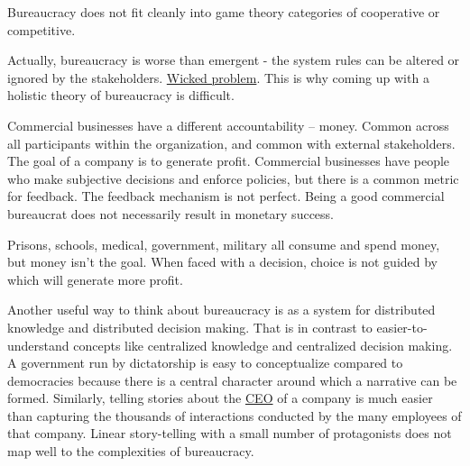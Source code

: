 Bureaucracy does not fit cleanly into game theory categories of cooperative or competitive.

Actually, bureaucracy is worse than emergent - the system rules can be altered or ignored by the stakeholders. \href{https://en.wikipedia.org/wiki/Wicked_problem}{Wicked problem}. This is why coming up with a holistic theory of bureaucracy is difficult. 

Commercial businesses have a different accountability -- money. Common across all participants within the organization, and common with external stakeholders. The goal of a company is to generate profit. Commercial businesses have people who make subjective decisions and enforce policies, but there is a common metric for feedback. The feedback mechanism is not perfect. Being a good commercial bureaucrat does not necessarily result in monetary success.

Prisons, schools, medical, government, military all consume and spend money, but money isn't the goal. When faced with a decision, choice is not guided by which will generate more profit. 




Another useful way to think about bureaucracy is as a system for distributed knowledge and distributed decision making. That is in contrast to easier-to-understand concepts like centralized knowledge and centralized decision making. A government run by dictatorship is easy to conceptualize compared to democracies because there is a central character around which a narrative can be formed. Similarly, telling stories about the \href{https://en.wikipedia.org/wiki/Chief_executive_officer}{CEO} of a company is much easier than capturing the thousands of interactions conducted by the many employees of that company. Linear story-telling with a small number of protagonists does not map well to the complexities of bureaucracy. 



